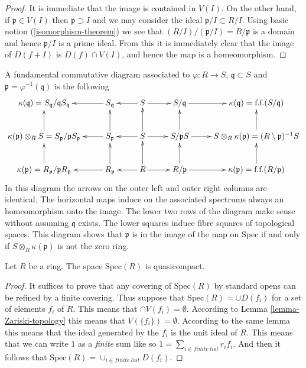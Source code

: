 \begin{proof}
It is immediate that the image is contained in $V(I)$.
On the other hand, if $\mathfrak p \in V(I)$
then $\mathfrak p \supset I$ and we may consider
the ideal $\mathfrak p /I \subset R/I$. Using
basic notion (\ref{isomorphism-theorem}) we see that
$(R/I)/(\mathfrak p/I) = R/\mathfrak p$ is a domain
and hence $\mathfrak p/I$ is a prime ideal. From this
it is immediately clear that the image of $D(f + I)$
is $D(f) \cap V(I)$, and hence the map is a homeomorphism.
\end{proof}

\begin{remark}
\label{remark-fundamental-diagram}
A fundamental commutative diagram associated to
$\varphi : R \to S$,
$\mathfrak q \subset S$ and
$\mathfrak p = \varphi^{-1}(\mathfrak q)$ is
the following
$$
\xymatrix{
\kappa(\mathfrak q) = S_{\mathfrak q}/{\mathfrak q}S_{\mathfrak q}
&
S_{\mathfrak q} \ar[l]
&
S \ar[r] \ar[l]
&
S/\mathfrak q \ar[r]
&
\kappa(\mathfrak q) = \text{f.f.}(S/\mathfrak q)
\\
\kappa(\mathfrak p) \otimes_R S = S_{\mathfrak p}/{\mathfrak p}S_{\mathfrak p} \ar[u]
&
S_{\mathfrak p} \ar[u] \ar[l]
&
S \ar[u] \ar[r] \ar[l]
&
S/\mathfrak pS \ar[u] \ar[r]
&
S \otimes_R \kappa(\mathfrak p) = (R \setminus \mathfrak p)^{-1}S \ar[u]
\\
\kappa(\mathfrak p) = R_{\mathfrak p}/{\mathfrak p}R_{\mathfrak p} \ar[u]
&
R_{\mathfrak p} \ar[u] \ar[l]
&
R \ar[u] \ar[r] \ar[l]
&
R/\mathfrak p \ar[u] \ar[r]
&
\kappa(\mathfrak p) = \text{f.f.}(R/\mathfrak p) \ar[u]
}
$$
In this diagram the arrows on the outer left and outer right columns
are identical. The horizontal maps induce on the associated spectrums
always an homeomorphism onto the image. The lower two rows
of the diagram make sense without assuming $\mathfrak q$ exists.
The lower squares induce fibre squares of topological spaces.
This diagram shows that $\mathfrak p$ is in the image
of the map on Spec if and only if $S \otimes_R \kappa(\mathfrak p)$
is not the zero ring.
\end{remark}

\begin{lemma}
\label{lemma-quasicompact}
Let $R$ be a ring. The space $\text{Spec}(R)$ is quasicompact.
\end{lemma}

\begin{proof}
It suffices to prove that any covering of $\text{Spec}(R)$
by standard opens can be refined by a finite covering.
Thus suppose that $\text{Spec}(R) = \cup D(f_i)$
for a set of elements $f_i$ of $R$. This means that
$\cap V(f_i) = \emptyset$. According to Lemma
\ref{lemma-Zariski-topology} this means that
$V(\{f_i \}) = \emptyset$. According to the
same lemma this means that the ideal generated
by the $f_i$ is the unit ideal of $R$. This means
that we can write $1$ as a {\it finite} sum like so
$1 = \sum_{i \in finite\ list} r_i f_i$.
And then it follows that $\text{Spec}(R) 
= \cup_{i \in finite\ list} D(f_i)$.
\end{proof}

